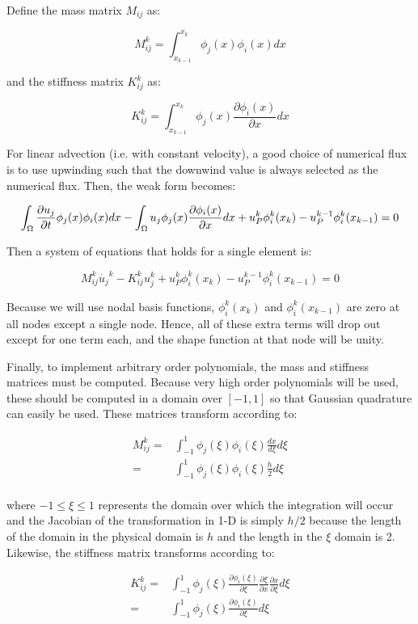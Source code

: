 \documentclass[10pt]{article}
\newcommand{\beq}{\begin{equation}}
\newcommand{\eeq}{\end{equation}}
\newcommand{\beqa}{\begin{equation}\begin{aligned}}
\newcommand{\eeqa}{\end{aligned}\end{equation}}
\begin{document}
Define the mass matrix \(M_{ij}\) as:

\beq
M_{ij}^k=\int_{x_{k-1}}^{x_k}\phi_j(x)\phi_i(x)dx
\eeq

and the stiffness matrix \(K_{ij}^k\) as:

\beq
K_{ij}^k=\int_{x_{k-1}}^{x_k}\phi_j(x)\frac{\partial \phi_i(x)}{\partial x}dx
\eeq

For linear advection (i.e. with constant velocity), a good choice of numerical flux is to use upwinding such that the downwind value is always selected as the numerical flux. Then, the weak form becomes:

\beq
\int_{\Omega}\frac{\partial u_j}{\partial t}\phi_j(x)\phi_i(x)dx-\int_{\Omega}u_j\phi_j(x)\frac{\partial \phi_i(x)}{\partial x}dx+u_P^k\phi_i^k(x_{k})-u_P^{k-1}\phi_i^k(x_{k-1})=0\\
\eeq

Then a system of equations that holds for a single element is:

\beq
M_{ij}^k\dot{u_j}^k-K_{ij}^ku_j^k+u_P^k\phi_i^k(x_{k})-u_P^{k-1}\phi_i^k(x_{k-1})=0
\eeq

Because we will use nodal basis functions, \(\phi_i^k(x_k)\) and \(\phi_i^k(x_{k-1})\) are zero at all nodes except a single node. Hence, all of these extra terms will drop out except for one term each, and the shape function at that node will be unity.

Finally, to implement arbitrary order polynomials, the mass and stiffness matrices must be computed. Because very high order polynomials will be used, these should be computed in a domain over \([-1,1]\) so that Gaussian quadrature can easily be used. These matrices transform according to:

\beqa
M_{ij}^k=&\int_{-1}^{1}\phi_j(\xi)\phi_i(\xi)\frac{dx}{d\xi}d\xi\\
=&\int_{-1}^{1}\phi_j(\xi)\phi_i(\xi)\frac{h}{2}d\xi\\
\eeqa

where \(-1\leq\xi\leq1\) represents the domain over which the integration will occur and the Jacobian of the transformation in 1-D is simply \(h/2\) because the length of the domain in the physical domain is \(h\) and the length in the \(\xi\) domain is 2. Likewise, the stiffness matrix transforms according to:

\beqa
K_{ij}^k=&\int_{-1}^{1}\phi_j(\xi)\frac{\partial \phi_i(\xi)}{\partial \xi}\frac{\partial \xi}{\partial x}\frac{\partial x}{\partial \xi}d\xi\\
=&\int_{-1}^{1}\phi_j(\xi)\frac{\partial \phi_i(\xi)}{\partial \xi}d\xi\\
\eeqa
\end{document}
